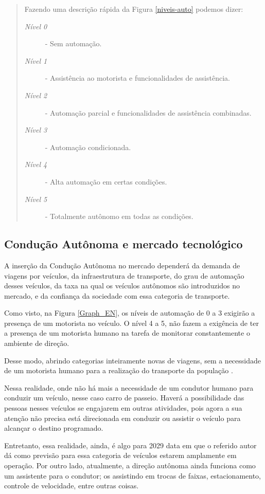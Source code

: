 \begin{quote}
Fazendo uma descrição rápida da Figura \ref{niveis-auto} podemos dizer:  
\begin{description}
\item[\textit{Nível 0}] - Sem automação.  \item[\textit{Nível 1}] - Assistência ao motorista e funcionalidades de assistência.  \item[\textit{Nível 2}] - Automação parcial e funcionalidades de assistência combinadas. \item[\textit{Nível 3}] - Automação condicionada.  
\item[\textit{Nível 4}] - Alta automação em certas condições.  
\item[\textit{Nível 5}] - Totalmente autônomo em todas as condições. 
\end{description}
\end{quote}

\subsection{Condução Autônoma e mercado tecnológico}

A inserção da Condução Autônoma no mercado dependerá da demanda de viagens por veículos, da infraestrutura de transporte, do grau de automação desses veículos, da taxa na qual os veículos autônomos são introduzidos no mercado, e da confiança da sociedade com essa categoria de transporte. 

Como visto, na Figura \ref{Graph_EN}, os níveis de automação de 0 a 3 exigirão a presença de um motorista no veículo. O nível 4 a 5, não fazem a exigência de ter a presença de um motorista humano na tarefa de monitorar constantemente o ambiente de direção. 

Desse modo, abrindo categorias inteiramente novas de viagens, sem a necessidade de um motorista humano para a realização do transporte da população \cite{notif}.

Nessa realidade, onde não há mais a necessidade de um condutor humano para conduzir um veículo, nesse caso carro de passeio. Haverá a possibilidade das pessoas nesses veículos se engajarem em outras atividades, pois agora a sua atenção não precisa está direcionada em conduzir ou assistir o veículo para alcançar o destino programado. 

Entretanto, essa realidade, ainda, é algo para 2029 \cite{elpais} data em que o referido autor dá como previsão para essa categoria de veículos estarem amplamente em operação. Por outro lado, atualmente, a direção autônoma ainda funciona como um assistente para o condutor; os assistindo em trocas de faixas, estacionamento, controle de velocidade, entre outras coisas.

